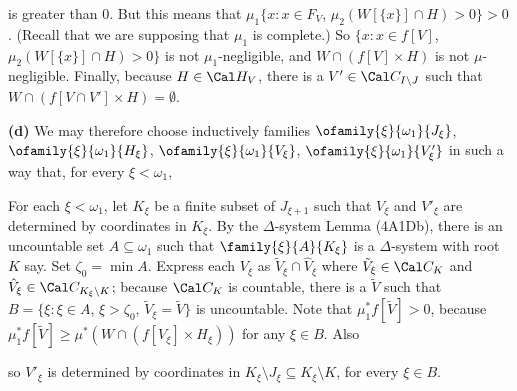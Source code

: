 {

\noindent is greater than $0$.   But this means that
$\mu_1\{x:x\in F_V$, $\mu_2(W[\{x\}]\cap H)>0\}>0$.   (Recall that we
are supposing that $\mu_1$ is complete.)   So
$\{x:x\in f[V]$, $\mu_2(W[\{x\}]\cap H)>0\}$ is not $\mu_1$-negligible,
and $W\cap(f[V]\times H)$ is not $\mu$-negligible.
Finally, because $H\in\Cal H_V$, there is a $V'\in\Cal C_{I\setminus J}$
such that $W\cap(f[V\cap V']\times H)=\emptyset$.\ \Qed

\medskip

{\bf (d)} We may therefore choose inductively families
$\ofamily{\xi}{\omega_1}{J_{\xi}}$,
$\ofamily{\xi}{\omega_1}{H_{\xi}}$,
$\ofamily{\xi}{\omega_1}{V_{\xi}}$,
$\ofamily{\xi}{\omega_1}{V'_{\xi}}$ in such a way that, for every
$\xi<\omega_1$,


\noindent For each $\xi<\omega_1$, let $K_{\xi}$ be a finite subset of
$J_{\xi+1}$ such that $V_{\xi}$ and $V'_{\xi}$ are determined by
coordinates in $K_{\xi}$.   By the $\Delta$-system Lemma (4A1Db), there
is an uncountable set $A\subseteq\omega_1$ such that
$\family{\xi}{A}{K_{\xi}}$ is a $\Delta$-system with root $K$ say.   Set
$\zeta_0=\min A$.    Express each $V_{\xi}$ as
$\tilde V_{\xi}\cap\hat V_{\xi}$ where  $\tilde V_{\xi}\in\Cal C_K$ and
$\hat V_{\xi}\in\Cal C_{K_{\xi}\setminus K}$;   because $\Cal C_K$ is
countable, there is a $\tilde V$ such that
$B=\{\xi:\xi\in A$, $\xi>\zeta_0$, $\tilde V_{\xi}=\tilde V\}$ is
uncountable.   Note that $\mu_1^*f[\tilde V]>0$, because
$\mu_1^*f[\tilde V]\ge\mu^*(W\cap(f[V_{\xi}]\times H_{\xi}))$ for any
$\xi\in B$.   Also


\noindent so $V'_{\xi}$ is determined by coordinates in
$K_{\xi}\setminus J_{\xi}\subseteq K_{\xi}\setminus K$, for every
$\xi\in B$.

}

